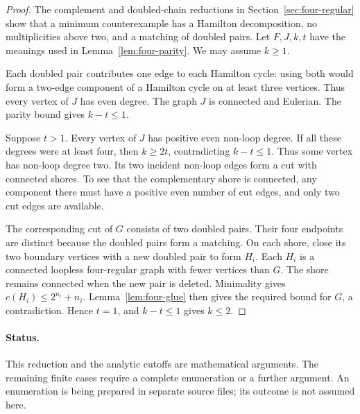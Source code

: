 \begin{proof}
The complement and doubled-chain reductions in Section~\ref{sec:four-regular}
show that a minimum counterexample has a Hamilton decomposition, no multiplicities above two,
and a matching of doubled pairs.
Let $F,J,k,t$ have the meanings used in Lemma~\ref{lem:four-parity}.
We may assume $k\ge1$.

Each doubled pair contributes one edge to each Hamilton cycle:
using both would form a two-edge component of a Hamilton cycle on at least three vertices.
Thus every vertex of $J$ has even degree.
The graph $J$ is connected and Eulerian.
The parity bound gives $k-t\le1$.

Suppose $t>1$.
Every vertex of $J$ has positive even non-loop degree.
If all these degrees were at least four, then $k\ge2t$, contradicting $k-t\le1$.
Thus some vertex has non-loop degree two.
Its two incident non-loop edges form a cut with connected shores.
To see that the complementary shore is connected, any component there must have a positive even
number of cut edges, and only two cut edges are available.

The corresponding cut of $G$ consists of two doubled pairs.
Their four endpoints are distinct because the doubled pairs form a matching.
On each shore, close its two boundary vertices with a new doubled pair to form $H_i$.
Each $H_i$ is a connected loopless four-regular graph with fewer vertices than $G$.
The shore remains connected when the new pair is deleted.
Minimality gives $c(H_i)\le2^{n_i}+n_i$.
Lemma~\ref{lem:four-glue} then gives the required bound for $G$, a contradiction.
Hence $t=1$, and $k-t\le1$ gives $k\le2$.
\end{proof}

\paragraph{Status.}
This reduction and the analytic cutoffs are mathematical arguments.
The remaining finite cases require a complete enumeration or a further argument.
An enumeration is being prepared in separate source files; its outcome is not assumed here.
